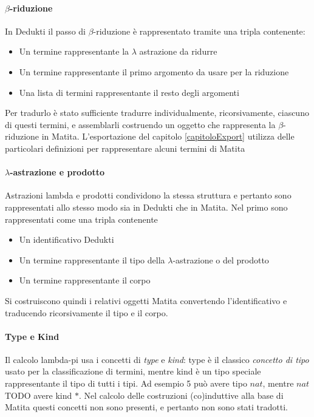 \documentclass[12pt,a4paper]{report}
\begin{document}
\paragraph{$\beta$-riduzione}
In Dedukti il passo di $\beta$-riduzione è rappresentato tramite una tripla
contenente: 
\begin{itemize}
  \item Un termine rappresentante la $\lambda$ astrazione da ridurre
  \item Un termine rappresentante il primo argomento da usare per la riduzione
  \item Una lista di termini rappresentante il resto degli argomenti
\end{itemize}
Per tradurlo è stato sufficiente tradurre individualmente, ricorsivamente, ciascuno
di questi termini, e assemblarli costruendo un oggetto che rappresenta la 
$\beta$-riduzione in Matita. 
L'esportazione del capitolo \ref{capitoloExport} utilizza delle particolari
definizioni per rappresentare alcuni termini di Matita %

\paragraph{$\lambda$-astrazione e prodotto}
Astrazioni lambda e prodotti condividono la stessa struttura e pertanto sono
rappresentati allo stesso modo sia in Dedukti che in Matita.
Nel primo sono rappresentati come una tripla contenente
\begin{itemize}
  \item Un identificativo Dedukti
  \item Un termine rappresentante il tipo della $\lambda$-astrazione o del prodotto
  \item Un termine rappresentante il corpo
\end{itemize}
Si costruiscono quindi i relativi oggetti Matita convertendo l'identificativo
e traducendo ricorsivamente il tipo e il corpo.

\paragraph{Type e Kind}
Il calcolo lambda-pi usa i concetti di \textit{type} e \textit{kind}: type è
il classico \textit{concetto di tipo} usato per la classificazione di termini,
mentre kind è un tipo speciale rappresentante il tipo di tutti i tipi. Ad 
esempio 5 può avere tipo $nat$, mentre $nat$ TODO avere kind $*$. Nel 
calcolo delle costruzioni (co)induttive alla base di Matita questi concetti
non sono presenti, e pertanto non sono stati tradotti. %
\end{document}
